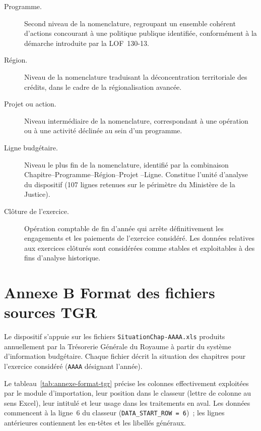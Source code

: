 \begin{description}
\item[Programme.] Second niveau de la nomenclature, regroupant un
ensemble coh\'erent d'actions concourant \`a une politique publique
identifi\'ee, conform\'ement \`a la d\'emarche introduite par la
LOF~130-13.

\item[R\'egion.] Niveau de la nomenclature traduisant la
d\'econcentration territoriale des cr\'edits, dans le cadre de la
r\'egionalisation avanc\'ee.

\item[Projet ou action.] Niveau interm\'ediaire de la nomenclature,
correspondant \`a une op\'eration ou \`a une activit\'e d\'eclin\'ee
au sein d'un programme.

\item[Ligne budg\'etaire.] Niveau le plus fin de la nomenclature,
identifi\'e par la combinaison Chapitre--Programme--R\'egion--Projet
--Ligne. Constitue l'unit\'e d'analyse du dispositif (107 lignes
retenues sur le p\'erim\`etre du Minist\`ere de la Justice).

\item[Cl\^oture de l'exercice.] Op\'eration comptable de fin d'ann\'ee
qui arr\^ete d\'efinitivement les engagements et les paiements de
l'exercice consid\'er\'e. Les donn\'ees relatives aux exercices
cl\^otur\'es sont consid\'er\'ees comme stables et exploitables \`a
des fins d'analyse historique.
\end{description}

\newpage

\section*{Annexe B \quad Format des fichiers sources TGR}

Le dispositif s'appuie sur les fichiers \texttt{SituationChap-AAAA.xls}
produits annuellement par la Tr\'esorerie G\'en\'erale du Royaume \`a
partir du syst\`eme d'information budg\'etaire. Chaque fichier d\'ecrit
la situation des chapitres pour l'exercice consid\'er\'e (\texttt{AAAA}
d\'esignant l'ann\'ee).

Le tableau~\ref{tab:annexe-format-tgr} pr\'ecise les colonnes
effectivement exploit\'ees par le module d'importation, leur position
dans le classeur (lettre de colonne au sens Excel), leur intitul\'e et
leur usage dans les traitements en aval. Les donn\'ees commencent
\`a la ligne~6 du classeur (\texttt{DATA\_START\_ROW = 6})~; les lignes
ant\'erieures contiennent les en-t\^etes et les libell\'es g\'en\'eraux.


